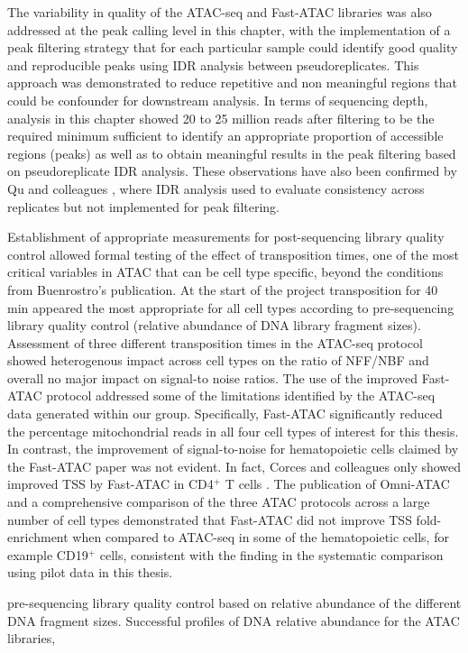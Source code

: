 The variability in quality of the ATAC-seq and Fast-ATAC libraries was also addressed at the peak calling level in this chapter, with the implementation of a peak filtering strategy that for each particular sample could identify good quality and reproducible peaks using IDR analysis between pseudoreplicates. This approach was demonstrated to reduce  repetitive and non meaningful regions that could be confounder for downstream analysis. In terms of sequencing depth, analysis in this chapter showed 20 to 25 million reads after filtering to be the required minimum sufficient to identify an appropriate proportion of accessible regions (peaks) as well as to obtain meaningful results in the peak filtering based on pseudoreplicate IDR analysis. These observations have also been confirmed by Qu and colleagues \parencite{Qu2017}, where IDR analysis used to evaluate consistency across replicates but not implemented for peak filtering.

Establishment of appropriate measurements for post-sequencing library quality control allowed formal testing of the effect of transposition times, one of the most critical variables in ATAC that can be cell type specific, beyond the conditions from Buenrostro's publication. At the start of the project transposition for 40 min appeared the most appropriate for all cell types according to pre-sequencing library quality control (relative abundance of DNA library fragment sizes). Assessment of three different transposition times in the ATAC-seq protocol showed heterogenous impact across cell types on the ratio of NFF/NBF and overall no major impact on signal-to noise ratios. The use of the improved Fast-ATAC protocol addressed some of the limitations identified by the ATAC-seq data generated within our group. Specifically, Fast-ATAC significantly reduced the percentage mitochondrial reads in all four cell types of interest for this thesis. In contrast, the improvement of signal-to-noise for hematopoietic cells claimed by the Fast-ATAC paper was not evident. In fact, Corces and colleagues only showed improved TSS by Fast-ATAC in CD4$^+$ T cells \parencite{Corces2016}. The publication of Omni-ATAC and a comprehensive comparison of the three ATAC protocols across a large number of cell types demonstrated that Fast-ATAC did not improve TSS fold-enrichment when compared to ATAC-seq in some of the hematopoietic cells, for example CD19$^+$ cells, consistent with the finding in the systematic comparison using pilot data in this thesis.

pre-sequencing library quality control based on relative abundance of the different DNA fragment sizes. Successful profiles of DNA relative abundance for the ATAC libraries,



